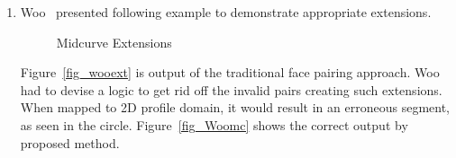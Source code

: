 \begin{enumerate}
\item
Woo~\cite{Woo2013} presented following example to demonstrate appropriate extensions. 


\begin{figure}[h!]
\centering     %
{} \quad
{} \quad
\caption{Midcurve Extensions}
  \label{fig:midsurfcelljoin:Woomc}
\end{figure}


Figure~\ref{fig_wooext} is output of the traditional face pairing approach. Woo had to devise a logic to get rid off the invalid pairs creating such extensions. When mapped to 2D profile domain, it would result in an erroneous segment, as seen in the circle. Figure~\ref{fig_Woomc} shows the correct output by proposed method.


%
\end{enumerate}

